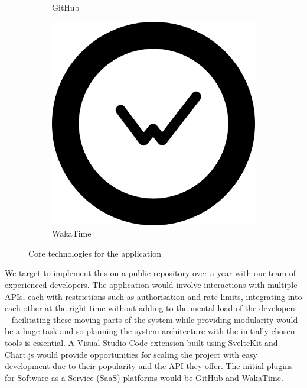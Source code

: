 \documentclass{prrcs}
\newcommand{\cmmnt}[1]{}
\begin{document}
\begin{figure}[h]
\begin{subfigure}[b]{0.08\textwidth}
        \caption*{{\footnotesize GitHub}}    
    \end{subfigure}
    \hfill
    \begin{subfigure}[b]{0.08\textwidth}  
        \centering 
        \includegraphics[width=\textwidth]{wakatime_logo.png}
        \caption*{{\footnotesize WakaTime}}    
    \end{subfigure}
    \caption{Core technologies for the application}
\end{figure}

We target to implement this on a public repository over a year with our team of experienced developers. The application would involve interactions with multiple APIs, each with restrictions such as authorisation and rate limits, integrating into each other at the right time without adding to the mental load of the developers -- facilitating these moving parts of the system while providing modularity would be a huge task and so planning the system architecture with the initially chosen tools is essential. A Visual Studio Code\cmmnt{\cite{VisualStudioCode}} extension built using SvelteKit\cmmnt{\cite{SvelteKitWebDevelopment}} and Chart.js\cmmnt{\cite{ChartJs}} would provide opportunities for scaling the project with easy development due to their popularity and the API they offer. The initial plugins for Software as a Service (SaaS) platforms would be GitHub and WakaTime.
\end{document}
